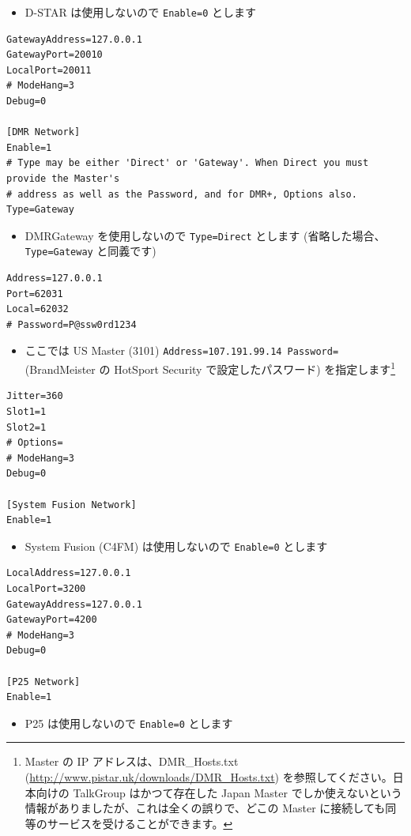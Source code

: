 \documentclass[a4j,oneside]{ujbook}
\begin{document}
\begin{itemize}
 \renewcommand{\labelitemi}{$\triangleright$}
 \item D-STAR は使用しないので \verb+Enable=0+ とします
\end{itemize}
\begin{verbatim}
GatewayAddress=127.0.0.1
GatewayPort=20010
LocalPort=20011
# ModeHang=3
Debug=0

[DMR Network]
Enable=1
# Type may be either 'Direct' or 'Gateway'. When Direct you must provide the Master's
# address as well as the Password, and for DMR+, Options also.
Type=Gateway
\end{verbatim}
\begin{itemize}
 \renewcommand{\labelitemi}{$\triangleright$}
 \item DMRGateway を使用しないので \verb+Type=Direct+ とします (省略した場合、\verb+Type=Gateway+ と同義です)
\end{itemize}
\begin{verbatim}
Address=127.0.0.1
Port=62031
Local=62032
# Password=P@ssw0rd1234
\end{verbatim}
\begin{itemize}
 \renewcommand{\labelitemi}{$\triangleright$}
 \item ここでは US Master (3101) \verb+Address=107.191.99.14 Password=+(BrandMeister の HotSport Security で設定したパスワード) を指定します\footnote{Master の IP アドレスは、DMR\_Hosts.txt (\url{http://www.pistar.uk/downloads/DMR_Hosts.txt}) を参照してください。日本向けの TalkGroup はかつて存在した Japan Master でしか使えないという情報がありましたが、これは全くの誤りで、どこの Master に接続しても同等のサービスを受けることができます。}
\end{itemize}
\begin{verbatim}
Jitter=360
Slot1=1
Slot2=1
# Options=
# ModeHang=3
Debug=0

[System Fusion Network]
Enable=1
\end{verbatim}
\begin{itemize}
 \renewcommand{\labelitemi}{$\triangleright$}
 \item System Fusion (C4FM) は使用しないので \verb+Enable=0+ とします
\end{itemize}
\begin{verbatim}
LocalAddress=127.0.0.1
LocalPort=3200
GatewayAddress=127.0.0.1
GatewayPort=4200
# ModeHang=3
Debug=0

[P25 Network]
Enable=1
\end{verbatim}
\begin{itemize}
 \renewcommand{\labelitemi}{$\triangleright$}
 \item P25 は使用しないので \verb+Enable=0+ とします
\end{itemize}
\end{document}
